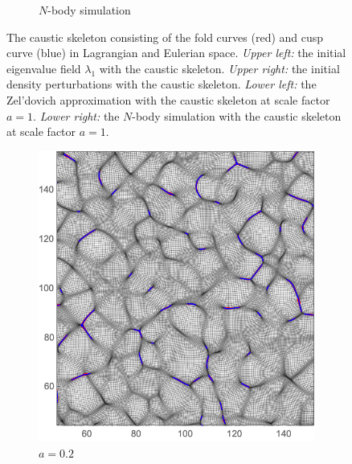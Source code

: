\documentclass[a4paper, 11pt]{article}
\begin{document}
\begin{figure}
\begin{subfigure}[b]{0.49\textwidth}
\caption{$N$-body simulation}
\end{subfigure}
\caption{The caustic skeleton consisting of the fold curves (red) and
cusp curve (blue) in Lagrangian and Eulerian space. \textit{Upper left:}
the initial eigenvalue field $\lambda_1$ with the caustic skeleton.
\textit{Upper right:} the initial density perturbations with the caustic
skeleton. \textit{Lower left:} the Zel'dovich approximation with the
caustic skeleton at scale factor $a=1$. \textit{Lower right:} the
$N$-body simulation with the caustic skeleton at scale factor
$a=1$.}\label{fig:Eulerian}
\end{figure}

\begin{figure}
\centering
\begin{subfigure}[b]{0.49\textwidth}
\includegraphics[width=\textwidth]{Evolution_020}
\caption{$a=0.2$}
\end{subfigure}~
\begin{subfigure}[b]{0.49\textwidth}

\end{subfigure}
\end{figure}
\end{document}
